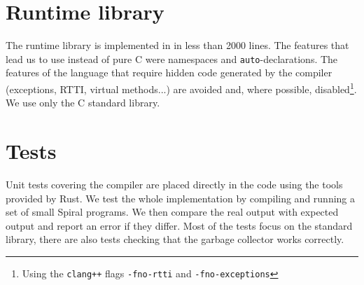 \section{Runtime library}

The runtime library is implemented in \Cplusplus{} in less than 2000 lines. The
features that lead us to use \Cplusplus{} instead of pure C were namespaces and
\texttt{auto}-declarations. The features of the language that require hidden
code generated by the compiler (exceptions, RTTI, virtual methods...) are
avoided and, where possible, disabled\footnote{Using the \texttt{clang++} flags
\texttt{-fno-rtti} and \texttt{-fno-exceptions}}. We use only the C standard
library.

\section{Tests}

Unit tests covering the compiler are placed directly in the code using the tools
provided by Rust. We test the whole implementation by compiling and running a
set of small Spiral programs. We then compare the real output with expected
output and report an error if they differ. Most of the tests focus on the
standard library, there are also tests checking that the garbage collector works
correctly.

